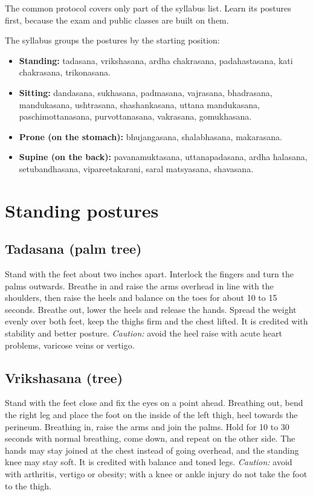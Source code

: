 The common protocol covers only part of the syllabus list. Learn its postures first, because the exam and public classes are built on them.

The syllabus groups the postures by the starting position:
\begin{itemize}
\item \textbf{Standing:} tadasana, vrikshasana, ardha chakrasana, padahastasana, kati chakrasana, trikonasana.
\item \textbf{Sitting:} dandasana, sukhasana, padmasana, vajrasana, bhadrasana, mandukasana, ushtrasana, shashankasana, uttana mandukasana, paschimottanasana, purvottanasana, vakrasana, gomukhasana.
\item \textbf{Prone (on the stomach):} bhujangasana, shalabhasana, makarasana.
\item \textbf{Supine (on the back):} pavanamuktasana, uttanapadasana, ardha halasana, setubandhasana, vipareetakarani, saral matsyasana, shavasana.
\end{itemize}

\section{Standing postures}

\subsection*{Tadasana (palm tree)}
Stand with the feet about two inches apart. Interlock the fingers and turn the palms outwards. Breathe in and raise the arms overhead in line with the shoulders, then raise the heels and balance on the toes for about 10 to 15 seconds. Breathe out, lower the heels and release the hands. Spread the weight evenly over both feet, keep the thighs firm and the chest lifted. It is credited with stability and better posture.
\textit{Caution:} avoid the heel raise with acute heart problems, varicose veins or vertigo.

\subsection*{Vrikshasana (tree)}
Stand with the feet close and fix the eyes on a point ahead. Breathing out, bend the right leg and place the foot on the inside of the left thigh, heel towards the perineum. Breathing in, raise the arms and join the palms. Hold for 10 to 30 seconds with normal breathing, come down, and repeat on the other side. The hands may stay joined at the chest instead of going overhead, and the standing knee may stay soft. It is credited with balance and toned legs.
\textit{Caution:} avoid with arthritis, vertigo or obesity; with a knee or ankle injury do not take the foot to the thigh.

